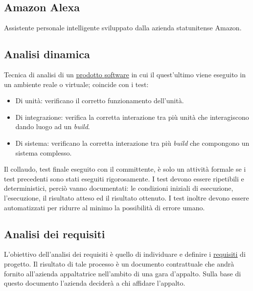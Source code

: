 





\copertina


\tableofcontents

\newpage

	\subsection{Amazon Alexa}
	\label{sec:alexa}
	Assistente personale intelligente sviluppato dalla azienda statunitense Amazon.

	\subsection{Analisi dinamica}
	\label{sec:analisidinamica}
	Tecnica di analisi di un \underline{\hyperref[sec:prodottosoftware]prodotto {software}} in cui il quest'ultimo viene eseguito in un ambiente reale o virtuale; coincide con i test:
	\begin{itemize}
		\item Di unità: verificano il corretto funzionamento dell'unità.
		\item Di integrazione: verifica la corretta interazione tra più unità che interagiscono dando luogo ad un \emph{build}.
		\item Di sistema: verificano la corretta interazione tra più \emph{build} che compongono un sistema complesso.
	\end{itemize}
	Il collaudo, test finale eseguito con il committente, è solo un attività formale se i test precedenti sono stati eseguiti rigorosamente. I test devono essere ripetibili e deterministici, perciò vanno documentati: le condizioni iniziali di esecuzione, l'esecuzione, il risultato atteso ed il risultato ottenuto. I test inoltre devono essere automatizzati per ridurre al minimo la possibilità di errore umano.

	\subsection{Analisi dei requisiti}
	\label{sec:analisirequisiti}
	L'obiettivo dell'analisi dei requisiti è quello di individuare e definire i \underline{\hyperref[sec:requisito]{requisiti}} di progetto. Il risultato di tale processo è un documento contrattuale che andrà fornito all'azienda appaltatrice nell'ambito di una gara d'appalto. Sulla base di questo documento l'azienda deciderà a chi affidare l'appalto.

